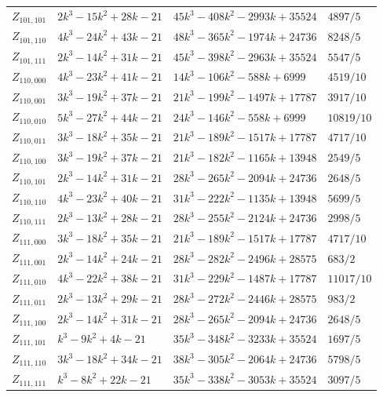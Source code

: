 \documentclass[11pt]{amsart}
\theoremstyle{definition}
\theoremstyle{remark}
\newcommand{\1}{\mathbf 1}
\begin{document}
{\begin{longtable}{@{}llll@{}}
$Z_{101,101}$ & $2 k^{3} - 15 k^{2} + 28 k - 21$ & $45 k^{3} - 408 k^{2} - 2993 k + 35524$ & $4897 / 5$\\
$Z_{101,110}$ & $4 k^{3} - 24 k^{2} + 43 k - 21$ & $48 k^{3} - 365 k^{2} - 1974 k + 24736$ & $8248 / 5$\\
$Z_{101,111}$ & $2 k^{3} - 14 k^{2} + 31 k - 21$ & $45 k^{3} - 398 k^{2} - 2963 k + 35524$ & $5547 / 5$\\
$Z_{110,000}$ & $4 k^{3} - 23 k^{2} + 41 k - 21$ & $14 k^{3} - 106 k^{2} - 588 k + 6999$ & $4519 / 10$\\
$Z_{110,001}$ & $3 k^{3} - 19 k^{2} + 37 k - 21$ & $21 k^{3} - 199 k^{2} - 1497 k + 17787$ & $3917 / 10$\\
$Z_{110,010}$ & $5 k^{3} - 27 k^{2} + 44 k - 21$ & $24 k^{3} - 146 k^{2} - 558 k + 6999$ & $10819 / 10$\\
$Z_{110,011}$ & $3 k^{3} - 18 k^{2} + 35 k - 21$ & $21 k^{3} - 189 k^{2} - 1517 k + 17787$ & $4717 / 10$\\
$Z_{110,100}$ & $3 k^{3} - 19 k^{2} + 37 k - 21$ & $21 k^{3} - 182 k^{2} - 1165 k + 13948$ & $2549 / 5$\\
$Z_{110,101}$ & $2 k^{3} - 14 k^{2} + 31 k - 21$ & $28 k^{3} - 265 k^{2} - 2094 k + 24736$ & $2648 / 5$\\
$Z_{110,110}$ & $4 k^{3} - 23 k^{2} + 40 k - 21$ & $31 k^{3} - 222 k^{2} - 1135 k + 13948$ & $5699 / 5$\\
$Z_{110,111}$ & $2 k^{3} - 13 k^{2} + 28 k - 21$ & $28 k^{3} - 255 k^{2} - 2124 k + 24736$ & $2998 / 5$\\
$Z_{111,000}$ & $3 k^{3} - 18 k^{2} + 35 k - 21$ & $21 k^{3} - 189 k^{2} - 1517 k + 17787$ & $4717 / 10$\\
$Z_{111,001}$ & $2 k^{3} - 14 k^{2} + 24 k - 21$ & $28 k^{3} - 282 k^{2} - 2496 k + 28575$ & $683 / 2$\\
$Z_{111,010}$ & $4 k^{3} - 22 k^{2} + 38 k - 21$ & $31 k^{3} - 229 k^{2} - 1487 k + 17787$ & $11017 / 10$\\
$Z_{111,011}$ & $2 k^{3} - 13 k^{2} + 29 k - 21$ & $28 k^{3} - 272 k^{2} - 2446 k + 28575$ & $983 / 2$\\
$Z_{111,100}$ & $2 k^{3} - 14 k^{2} + 31 k - 21$ & $28 k^{3} - 265 k^{2} - 2094 k + 24736$ & $2648 / 5$\\
$Z_{111,101}$ & $k^{3} - 9 k^{2} + 4 k - 21$ & $35 k^{3} - 348 k^{2} - 3233 k + 35524$ & $1697 / 5$\\
$Z_{111,110}$ & $3 k^{3} - 18 k^{2} + 34 k - 21$ & $38 k^{3} - 305 k^{2} - 2064 k + 24736$ & $5798 / 5$\\
$Z_{111,111}$ & $k^{3} - 8 k^{2} + 22 k - 21$ & $35 k^{3} - 338 k^{2} - 3053 k + 35524$ & $3097 / 5$\\
\bottomrule
\end{longtable}}
\end{document}
